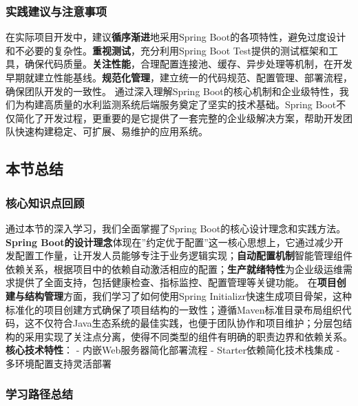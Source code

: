 \subsubsection{实践建议与注意事项}\label{ux5b9eux8df5ux5efaux8baeux4e0eux6ce8ux610fux4e8bux9879}
在实际项目开发中，建议\textbf{循序渐进}地采用Spring Boot的各项特性，避免过度设计和不必要的复杂性。\textbf{重视测试}，充分利用Spring Boot
Test提供的测试框架和工具，确保代码质量。\textbf{关注性能}，合理配置连接池、缓存、异步处理等机制，在开发早期就建立性能基线。\textbf{规范化管理}，建立统一的代码规范、配置管理、部署流程，确保团队开发的一致性。
通过深入理解Spring Boot的核心机制和企业级特性，我们为构建高质量的水利监测系统后端服务奠定了坚实的技术基础。Spring
Boot不仅简化了开发过程，更重要的是它提供了一套完整的企业级解决方案，帮助开发团队快速构建稳定、可扩展、易维护的应用系统。 \subsection{本节总结}\label{ux672cux8282ux603bux7ed3-1}
\subsubsection{核心知识点回顾}\label{ux6838ux5fc3ux77e5ux8bc6ux70b9ux56deux987e-1} 通过本节的深入学习，我们全面掌握了Spring
Boot的核心设计理念和实践方法。\textbf{Spring
Boot的设计理念}体现在''约定优于配置''这一核心思想上，它通过减少开发配置工作量，让开发人员能够专注于业务逻辑实现；\textbf{自动配置机制}智能管理组件依赖关系，根据项目中的依赖自动激活相应的配置；\textbf{生产就绪特性}为企业级运维需求提供了全面支持，包括健康检查、指标监控、配置管理等关键功能。
在\textbf{项目创建与结构管理}方面，我们学习了如何使用Spring
Initializr快速生成项目骨架，这种标准化的项目创建方式确保了项目结构的一致性；遵循Maven标准目录布局组织代码，这不仅符合Java生态系统的最佳实践，也便于团队协作和项目维护；分层包结构的采用实现了关注点分离，使得不同类型的组件有明确的职责边界和依赖关系。
\textbf{核心技术特性}： - 内嵌Web服务器简化部署流程 - Starter依赖简化技术栈集成 - 多环境配置支持灵活部署
\subsubsection{学习路径总结}\label{ux5b66ux4e60ux8defux5f84ux603bux7ed3}
